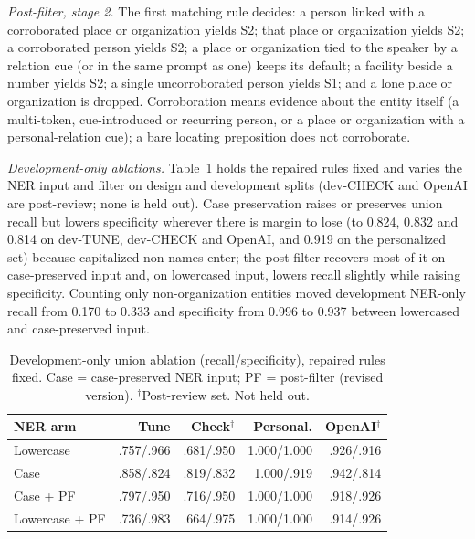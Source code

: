 \documentclass[sigconf]{acmart}
\theoremstyle{acmdefinition}\newtheorem{property}{Property}
\begin{document}
\textit{Post-filter, stage 2.} The first matching rule decides: a person linked with a corroborated place or organization yields S2; that place or organization yields S2; a corroborated person yields S2; a place or organization tied to the speaker by a relation cue (or in the same prompt as one) keeps its default; a facility beside a number yields S2; a single uncorroborated person yields S1; and a lone place or organization is dropped. Corroboration means evidence about the entity itself (a multi-token, cue-introduced or recurring person, or a place or organization with a personal-relation cue); a bare locating preposition does not corroborate.

\textit{Development-only ablations.} Table~\ref{tab:detprec_ablation} holds the repaired rules fixed and varies the NER input and filter on design and development splits (dev-CHECK and OpenAI are post-review; none is held out). Case preservation raises or preserves union recall but lowers specificity wherever there is margin to lose (to 0.824, 0.832 and 0.814 on dev-TUNE, dev-CHECK and OpenAI, and 0.919 on the personalized set) because capitalized non-names enter; the post-filter recovers most of it on case-preserved input and, on lowercased input, lowers recall slightly while raising specificity. Counting only non-organization entities moved development NER-only recall from 0.170 to 0.333 and specificity from 0.996 to 0.937 between lowercased and case-preserved input.

\begin{table}[t]
\centering
\caption{Development-only union ablation (recall/specificity), repaired rules fixed. Case = case-preserved NER input; PF = post-filter (revised version). $^\dagger$Post-review set. Not held out.}
\label{tab:detprec_ablation}
\small
\setlength{\tabcolsep}{3pt}
\begin{tabular}{lrrrr}
\toprule
NER arm & Tune & Check$^\dagger$ & Personal. & OpenAI$^\dagger$ \\
\midrule
Lowercase &.757/.966 &.681/.950 &1.000/1.000 &.926/.916 \\
Case &.858/.824 &.819/.832 &1.000/.919 &.942/.814 \\
Case + PF &.797/.950 &.716/.950 &1.000/1.000 &.918/.926 \\
Lowercase + PF &.736/.983 &.664/.975 &1.000/1.000 &.914/.926 \\
\bottomrule
\end{tabular}
\end{table}
\end{document}
